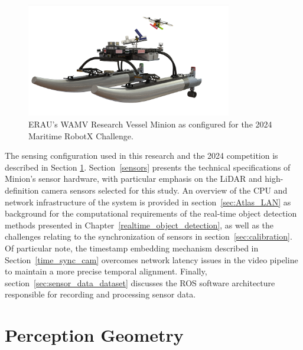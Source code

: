 \documentclass{erauthesis}
\begin{document}
\begin{figure}[t]
\centering
\includegraphics[width=0.8\textwidth]{Images/Minion.png}
\caption{ERAU's \ac{WAMV} Research Vessel Minion as configured for the 2024 Maritime RobotX Challenge.}
\label{fig:minion}
\end{figure}

The sensing configuration used in this research and the 2024 competition is described in Section \ref{perception_geometry}.
Section~\ref{sensors} presents the technical specifications of Minion's sensor hardware, with particular emphasis on the \ac{LiDAR} and high-definition camera sensors selected for this study.
An overview of the CPU and network infrastructure of the system is provided in section~\ref{sec:Atlas_LAN} as background for the computational requirements of the real-time object detection methods presented in Chapter~\ref{realtime_object_detection}, as well as the challenges relating to the synchronization of sensors in section~\ref{sec:calibration}.
Of particular note, the timestamp embedding mechanism described in Section~\ref{time_sync_cam} overcomes network latency issues in the video pipeline to maintain a more precise temporal alignment.
Finally, section~\ref{sec:sensor_data_dataset} discusses the \ac{ROS} software architecture responsible for recording and processing sensor data.

\section{Perception Geometry} \label{perception_geometry}
\end{document}
